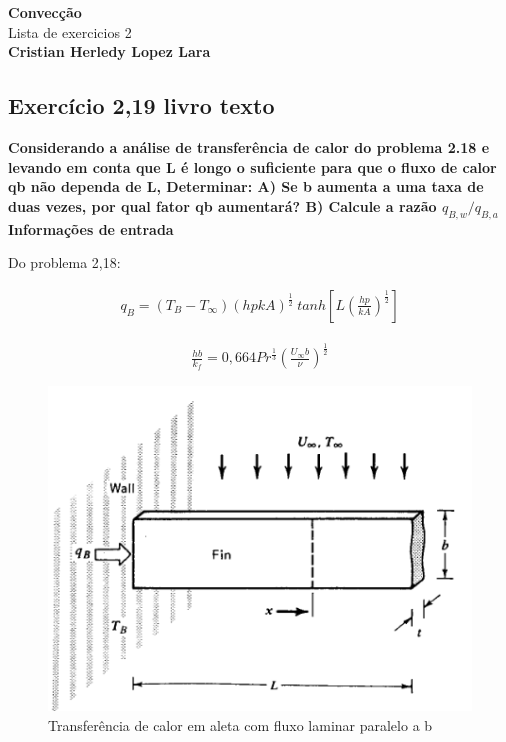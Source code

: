 \documentclass[12pt]{article}
\title{}
\author{}
\begin{document}
\begin{center}
	{\tiny {\normalsize {\large \textbf{Convecção}\\ Lista de exercicios 2\\
	
	\textbf{Cristian Herledy Lopez Lara}}}}
\end{center}

\subsection*{Exercício 2,19 livro texto}


\textbf{Considerando a análise de transferência de calor do problema 2.18 e levando em conta que L é longo o suficiente para que o fluxo de calor qb não dependa de L, Determinar: A) Se b aumenta a uma taxa de duas vezes, por qual fator qb aumentará? B) Calcule a razão $q_{B,w}/q_{B,a}$} \\



\textbf{Informações de entrada} 

Do problema 2,18:

\begin{equation}
	\begin{aligned}
		q_{B} = (T_{B} - T_{\infty})(hpkA)^{\frac{1}{2}}\ tanh\left[L(\frac{hp}{kA})^{\frac{1}{2}}\right] 
	\end{aligned}
\end{equation}

\begin{equation}
	\begin{aligned}
		\frac{hb}{k_{f}}=0,664Pr^{\frac{1}{3}}\left(\frac{U_{\infty }b}{\nu} \right)^{\frac{1}{2}} 
	\end{aligned}
\end{equation}

\begin{figure}[H]
	\centering
	\includegraphics[width=.65\textwidth]{Figures/1_1}
	\caption{Transferência de calor em aleta com fluxo laminar paralelo a b}
\end{figure}
\end{document}
